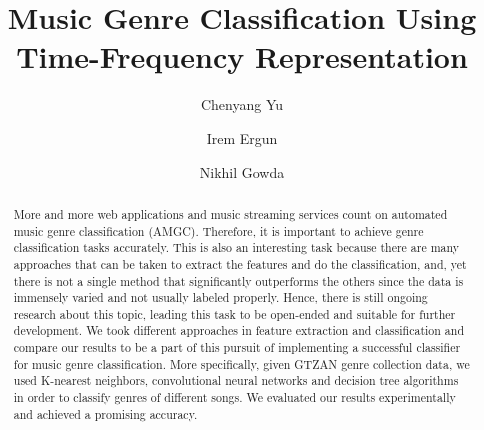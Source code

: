 \documentclass[acmtog, authorversion]{acmart}
\begin{document}
\title{Music Genre Classification Using Time-Frequency Representation}

\author{Chenyang Yu}
\author{Irem Ergun}
\author{Nikhil Gowda}


\renewcommand\shortauthors{Yang C. et al}

\begin{abstract}
  More and more web applications and music streaming services count on automated music genre classification (AMGC). Therefore, it is important to achieve 
  genre classification tasks accurately. This is also an interesting task because there are many approaches that can be taken to extract the features and 
  do the classification, and, yet there is not a single method that significantly outperforms the others since the data is immensely varied and not usually
   labeled properly. Hence, there is still ongoing research about this topic, leading this task to be open-ended and suitable for further development. We 
    took different approaches in feature extraction and classification and compare our results to be a part of this pursuit of implementing a 
   successful classifier for music genre classification. More specifically, given GTZAN genre collection data, we used K-nearest neighbors, 
   convolutional neural networks and decision tree algorithms in order to classify genres of different songs. We evaluated our results experimentally and 
   achieved a promising accuracy.
\end{abstract}



\maketitle
\end{document}
